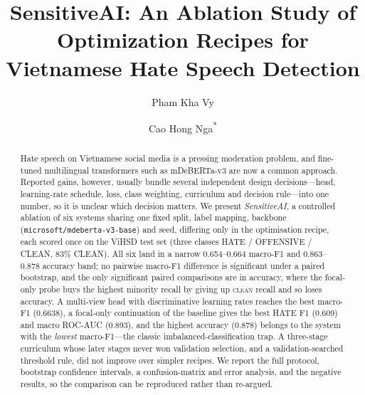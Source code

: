 \documentclass[runningheads]{llncs}
\begin{document}
\title{SensitiveAI: An Ablation Study of Optimization Recipes
       for Vietnamese Hate Speech Detection}

\author{
Pham Kha Vy \and
Cao Hong Nga\textsuperscript{*}
}




\maketitle

\begin{abstract}
Hate speech on Vietnamese social media is a pressing moderation problem, and
fine-tuned multilingual transformers such as mDeBERTa-v3 are now a common
approach.  Reported gains, however, usually bundle several independent design
decisions---head, learning-rate schedule, loss, class weighting, curriculum and
decision rule---into one number, so it is unclear which decision matters.  We
present \emph{SensitiveAI}, a controlled ablation of six systems sharing one fixed
split, label mapping, backbone (\texttt{microsoft/mdeberta-v3-base}) and seed,
differing only in the optimisation recipe, each scored once on the ViHSD test set
(three classes HATE / OFFENSIVE / CLEAN, 83\% CLEAN).  All six land in a narrow
0.654--0.664 macro-F1 and 0.863--0.878 accuracy band; no pairwise macro-F1
difference is significant under a paired bootstrap, and the only significant paired
comparisons are in accuracy, where the focal-only probe buys the highest minority
recall by giving up \textsc{clean} recall and so loses accuracy.  A
multi-view head with discriminative learning rates reaches the best macro-F1
(0.6638), a focal-only continuation of the baseline gives the best HATE F1 (0.609)
and macro ROC-AUC (0.893), and the highest accuracy (0.878) belongs to the system
with the \emph{lowest} macro-F1---the classic imbalanced-classification trap.  A
three-stage curriculum whose later stages never won validation selection, and a
validation-searched threshold rule, did not improve over simpler recipes.  We
report the full protocol, bootstrap confidence intervals,
a confusion-matrix and error analysis, and the negative results, so the comparison
can be reproduced rather than re-argued.
\end{abstract}













{\let\small\scriptsize}
\end{document}
